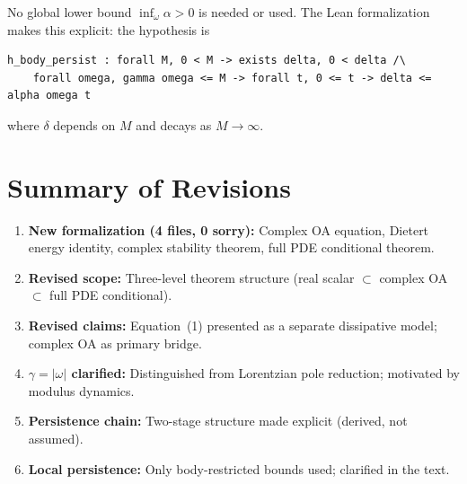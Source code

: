 \documentclass[11pt]{article}
\theoremstyle{plain}
\begin{document}
No global lower bound $\inf_\omega \alpha > 0$ is needed or used. The Lean formalization makes this explicit: the hypothesis is
\begin{verbatim}
h_body_persist : forall M, 0 < M -> exists delta, 0 < delta /\
    forall omega, gamma omega <= M -> forall t, 0 <= t -> delta <= alpha omega t
\end{verbatim}
where $\delta$ depends on $M$ and decays as $M \to \infty$.

\section*{Summary of Revisions}

\begin{enumerate}
\item \textbf{New formalization (4 files, 0 sorry):} Complex OA equation, Dietert energy identity, complex stability theorem, full PDE conditional theorem.
\item \textbf{Revised scope:} Three-level theorem structure (real scalar $\subset$ complex OA $\subset$ full PDE conditional).
\item \textbf{Revised claims:} Equation~(1) presented as a separate dissipative model; complex OA as primary bridge.
\item \textbf{$\gamma = |\omega|$ clarified:} Distinguished from Lorentzian pole reduction; motivated by modulus dynamics.
\item \textbf{Persistence chain:} Two-stage structure made explicit (derived, not assumed).
\item \textbf{Local persistence:} Only body-restricted bounds used; clarified in the text.
\end{enumerate}
\end{document}
